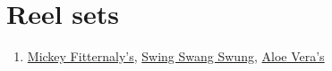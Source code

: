 \documentclass[a4paper,notitlepage,twoside]{book}
\begin{document}
\section{Reel sets}
\begin{enumerate}
\item \hyperlink{reel:MickeyFitternalys}{Mickey Fitternaly's}, \hyperlink{reel:SwingSwangSwung}{Swing Swang Swung}, \hyperlink{reel:AloeVeras}{Aloe Vera's}  
\end{enumerate}


\clearpage
\printindex

\backmatter 

\end{document}

